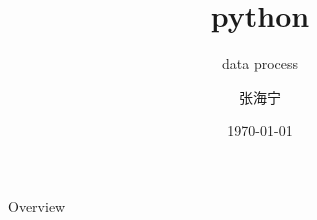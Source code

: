 \documentclass{beamer}
\title[Django]{python} %
\subtitle{data process}
\author{张海宁} %
\institute[计算机科学与技术学院] %
{
贵州大学 \\ %
\medskip
\textit{hnzhang1@gzu.edu.cn} %
}
\date{\today} %
\begin{document}
\begin{frame}
\titlepage %
\end{frame}
\begin{frame}{Overview}
\tableofcontents
\end{frame}




\end{document}
